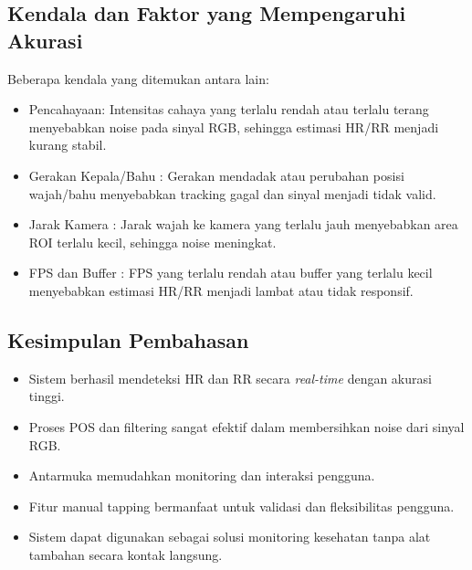 \documentclass[11pt,a4paper]{article}
\begin{document}
\subsection{Kendala dan Faktor yang Mempengaruhi Akurasi}
Beberapa kendala yang ditemukan antara lain:
\begin{itemize}
    \item Pencahayaan: Intensitas cahaya yang terlalu rendah atau terlalu terang menyebabkan noise pada sinyal RGB, sehingga estimasi HR/RR menjadi kurang stabil.
    \item Gerakan Kepala/Bahu : Gerakan mendadak atau perubahan posisi wajah/bahu menyebabkan tracking gagal dan sinyal menjadi tidak valid.
    \item Jarak Kamera : Jarak wajah ke kamera yang terlalu jauh menyebabkan area ROI terlalu kecil, sehingga noise meningkat.
    \item FPS dan Buffer : FPS yang terlalu rendah atau buffer yang terlalu kecil menyebabkan estimasi HR/RR menjadi lambat atau tidak responsif.
    \end{itemize}

\subsection{ Kesimpulan Pembahasan}
    \begin{itemize}
    \item Sistem berhasil mendeteksi HR dan RR secara \textit{real-time} dengan akurasi tinggi.
    \item Proses POS dan filtering sangat efektif dalam membersihkan noise dari sinyal RGB.
    \item Antarmuka memudahkan monitoring dan interaksi pengguna.
    \item Fitur manual tapping bermanfaat untuk validasi dan fleksibilitas pengguna.
    \item Sistem dapat digunakan sebagai solusi monitoring kesehatan tanpa alat tambahan secara kontak langsung.
    \end{itemize}

\newpage


\end{document}

